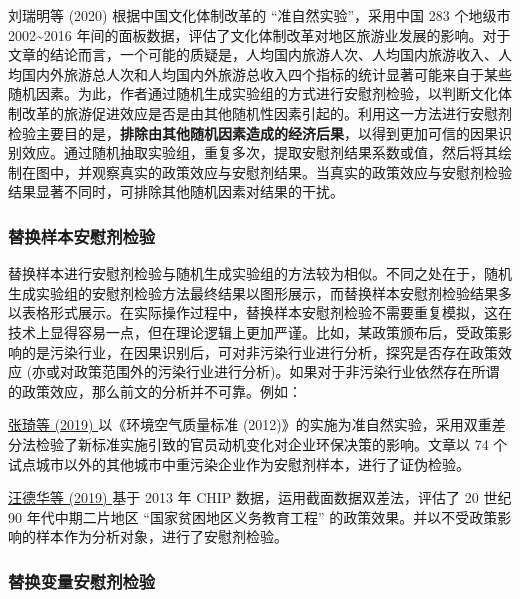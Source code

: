 \documentclass[11pt,a4paper]{ctexart}
\begin{document}
刘瑞明等 (2020) 根据中国文化体制改革的 ``准自然实验''，采用中国 283
个地级市 2002\textasciitilde2016
年间的面板数据，评估了文化体制改革对地区旅游业发展的影响。对于文章的结论而言，一个可能的质疑是，人均国内旅游人次、人均国内旅游收入、人均国内外旅游总人次和人均国内外旅游总收入四个指标的统计显著可能来自于某些随机因素。为此，作者通过随机生成实验组的方式进行安慰剂检验，以判断文化体制改革的旅游促进效应是否是由其他随机性因素引起的。利用这一方法进行安慰剂检验主要目的是，\textbf{排除由其他随机因素造成的经济后果}，以得到更加可信的因果识别效应。通过随机抽取实验组，重复多次，提取安慰剂结果系数或值，然后将其绘制在图中，并观察真实的政策效应与安慰剂结果。当真实的政策效应与安慰剂检验结果显著不同时，可排除其他随机因素对结果的干扰。

\subsubsection{替换样本安慰剂检验}

替换样本进行安慰剂检验与随机生成实验组的方法较为相似。不同之处在于，随机生成实验组的安慰剂检验方法最终结果以图形展示，而替换样本安慰剂检验结果多以表格形式展示。在实际操作过程中，替换样本安慰剂检验不需要重复模拟，这在技术上显得容易一点，但在理论逻辑上更加严谨。比如，某政策颁布后，受政策影响的是污染行业，在因果识别后，可对非污染行业进行分析，探究是否存在政策效应
(亦或对政策范围外的污染行业进行分析)。如果对于非污染行业依然存在所谓的政策效应，那么前文的分析并不可靠。例如：

\href{https://kns.cnki.net/kcms/detail/detail.aspx?dbcode=CJFD&dbname=CJFDLAST2019&filename=JJYJ201906013&v=ffsbFCXZ\%25mmd2BXG0YbbkpadH7DwZ\%25mmd2FGMJmqJVxvNeOwdAT19M2y3dn\%25mmd2BWyvcCYeXt7xO1w}{张琦等
(2019) }以《环境空气质量标准
(2012)》的实施为准自然实验，采用双重差分法检验了新标准实施引致的官员动机变化对企业环保决策的影响。文章以
74 个试点城市以外的其他城市中重污染企业作为安慰剂样本，进行了证伪检验。

\href{https://kns.cnki.net/kcms/detail/detail.aspx?dbcode=CJFD&dbname=CJFDLAST2019&filename=JJYJ201909011&v=ffsbFCXZ\%25mmd2BXFv1AqSPQkJDE8yPInaWCFymgk76UqwbMjd3e\%25mmd2FH0f96cgvh2LH1HJPY}{汪德华等
(2019) }基于 2013 年 CHIP 数据，运用截面数据双差法，评估了 20 世纪 90
年代中期二片地区 ``国家贫困地区义务教育工程''
的政策效果。并以不受政策影响的样本作为分析对象，进行了安慰剂检验。

\subsubsection{替换变量安慰剂检验}
\end{document}
